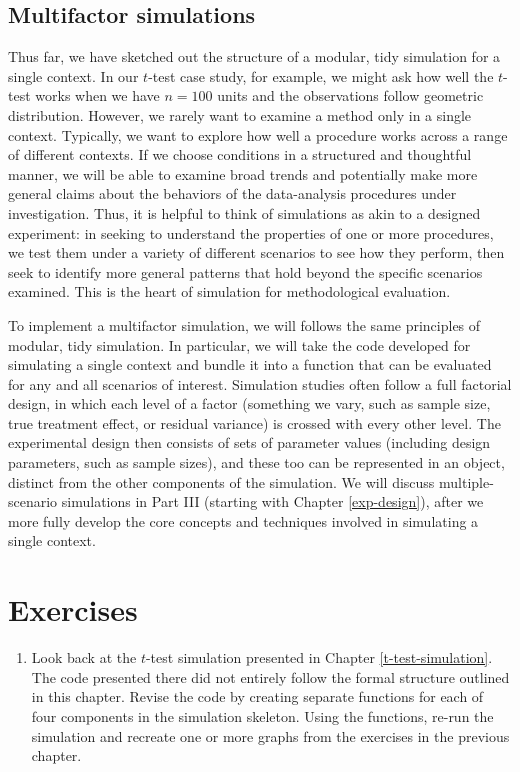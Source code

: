 \documentclass[
]{book}
\providecommand{\tightlist}{%
  \setlength{\itemsep}{0pt}\setlength{\parskip}{0pt}}
\begin{document}
\subsection{Multifactor simulations}\label{multifactor-simulations}

Thus far, we have sketched out the structure of a modular, tidy simulation for a single context.
In our \(t\)-test case study, for example, we might ask how well the \(t\)-test works when we have \(n=100\) units and the observations follow geometric distribution.
However, we rarely want to examine a method only in a single context.
Typically, we want to explore how well a procedure works across a range of different contexts.
If we choose conditions in a structured and thoughtful manner, we will be able to examine broad trends and potentially make more general claims about the behaviors of the data-analysis procedures under investigation.
Thus, it is helpful to think of simulations as akin to a designed experiment: in seeking to understand the properties of one or more procedures, we test them under a variety of different scenarios to see how they perform, then seek to identify more general patterns that hold beyond the specific scenarios examined.
This is the heart of simulation for methodological evaluation.

To implement a multifactor simulation, we will follows the same principles of modular, tidy simulation.
In particular, we will take the code developed for simulating a single context and bundle it into a function that can be evaluated for any and all scenarios of interest.
Simulation studies often follow a full factorial design, in which each level of a factor (something we vary, such as sample size, true treatment effect, or residual variance) is crossed with every other level.
The experimental design then consists of sets of parameter values (including design parameters, such as sample sizes), and these too can be represented in an object, distinct from the other components of the simulation.
We will discuss multiple-scenario simulations in Part III (starting with Chapter \ref{exp-design}), after we more fully develop the core concepts and techniques involved in simulating a single context.

\section{Exercises}\label{exercises-1}

\begin{enumerate}
\def\labelenumi{\arabic{enumi}.}
\tightlist
\item
  Look back at the \(t\)-test simulation presented in Chapter \ref{t-test-simulation}. The code presented there did not entirely follow the formal structure outlined in this chapter. Revise the code by creating separate functions for each of four components in the simulation skeleton. Using the functions, re-run the simulation and recreate one or more graphs from the exercises in the previous chapter.
\end{enumerate}
\end{document}
